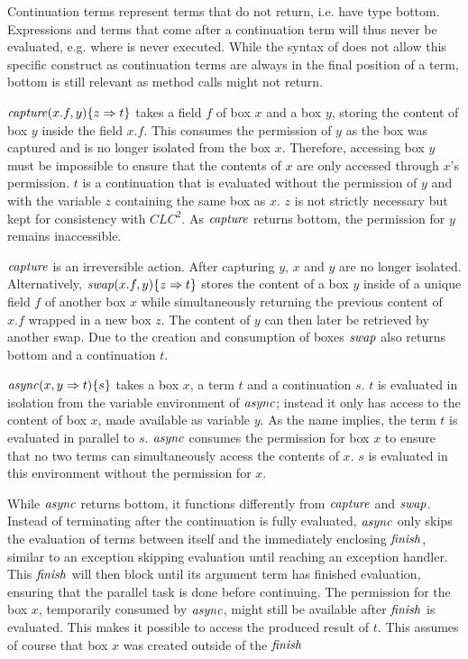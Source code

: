 Continuation terms represent terms that do not return, i.e. have type bottom. Expressions and terms that come after a continuation term will thus never be evaluated, e.g.  where  is never executed. While the syntax of \plc does not allow this specific construct as continuation terms are always in the final position of a term, bottom is still relevant as method calls might not return. 

$\mathop{\mathit{capture}}(x.f,y)\{z \Rightarrow t\}$ takes a field $f$ of box $x$ and a box $y$, storing the content of box $y$ inside the field $x.f$. This consumes the permission of $y$ as the box was captured and is no longer isolated from the box $x$. Therefore, accessing box $y$ must be impossible to ensure that the contents of $x$ are only accessed through $x$'s permission. $t$ is a continuation that is evaluated without the permission of $y$ and with the variable $z$ containing the same box as $x$. $z$ is not strictly necessary but kept for consistency with $CLC^2$. As $\mathop{\mathit{capture}}$ returns bottom, the permission for $y$ remains inaccessible.

$\mathop{\mathit{capture}}$ is an irreversible action. After capturing $y$, $x$ and $y$ are no longer isolated. Alternatively, $\mathop{\mathit{swap}}(x.f, y)\{z \Rightarrow t\}$ stores the content of a box $y$ inside of a unique field $f$ of another box $x$ while simultaneously returning the previous content of $x.f$ wrapped in a new box $z$. The content of $y$ can then later be retrieved by another swap. Due to the creation and consumption of boxes $\mathop{\mathit{swap}}$ also returns bottom and a continuation $t$.

$\mathop{\mathit{async}}(x, y \Rightarrow t)\{ s \}$ takes a box $x$, a term $t$ and a continuation $s$. $t$ is evaluated in isolation from the variable environment of $\mathop{\mathit{async}}$; instead it only has access to the content of box $x$, made available as variable $y$. As the name implies, the term $t$ is evaluated in parallel to $s$. $\mathop{\mathit{async}}$ consumes the permission for box $x$ to ensure that no two terms can simultaneously access the contents of $x$. $s$ is evaluated in this environment without the permission for $x$.

While $\mathop{\mathit{async}}$ returns bottom, it functions differently from $\mathop{\mathit{capture}}$ and $\mathop{\mathit{swap}}$. Instead of terminating after the continuation is fully evaluated, $\mathop{\mathit{async}}$ only skips the evaluation of terms between itself and the immediately enclosing $\mathop{\mathit{finish}}$, similar to an exception skipping evaluation until reaching an exception handler. This $\mathop{\mathit{finish}}$ will then block until its argument term has finished evaluation, ensuring that the parallel task is done before continuing. The permission for the box $x$, temporarily consumed by $\mathop{\mathit{async}}$, might still be available after $\mathop{\mathit{finish}}$ is evaluated. This makes it possible to access the produced result of $t$. This assumes of course that box $x$ was created outside of the $\mathop{\mathit{finish}}$

